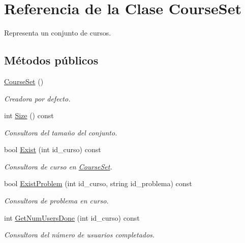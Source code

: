 \hypertarget{class_course_set}{}\section{Referencia de la Clase Course\+Set}
\label{class_course_set}


Representa un conjunto de cursos.  


\subsection*{Métodos públicos}
\begin{DoxyCompactItemize}
\item 
\mbox{\hyperlink{class_course_set_ae0b73bd2e6bda115838ba65644e015bc}{Course\+Set}} ()
\begin{DoxyCompactList}\small\item\em Creadora por defecto. \end{DoxyCompactList}\item 
int \mbox{\hyperlink{class_course_set_ac255028f38ba0b5b3ef1994e2a9a6c6f}{Size}} () const
\begin{DoxyCompactList}\small\item\em Consultora del tamaño del conjunto. \end{DoxyCompactList}\item 
bool \mbox{\hyperlink{class_course_set_a1ced9926115a2fbc8058982d148040f1}{Exist}} (int id\+\_\+curso) const
\begin{DoxyCompactList}\small\item\em Consultora de curso en \mbox{\hyperlink{class_course_set}{Course\+Set}}. \end{DoxyCompactList}\item 
bool \mbox{\hyperlink{class_course_set_a3ad118865a697fbb3e5765fc6583346e}{Exist\+Problem}} (int id\+\_\+curso, string id\+\_\+problema) const
\begin{DoxyCompactList}\small\item\em Consultora de problema en curso. \end{DoxyCompactList}\item 
int \mbox{\hyperlink{class_course_set_a46150057534a76182941f23beb2ce4cc}{Get\+Num\+Users\+Done}} (int id\+\_\+curso) const
\begin{DoxyCompactList}\small\item\em Consultora del número de usuarios completados. \end{DoxyCompactList}\item 

\end{DoxyCompactItemize}
